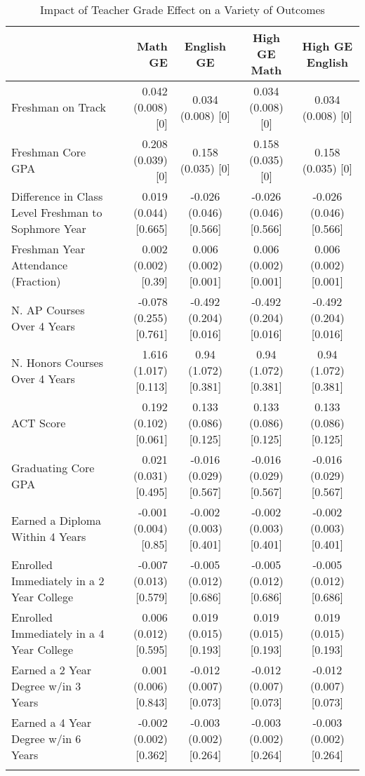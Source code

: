 \begin{table}

\caption{Impact of Teacher Grade Effect on a Variety of Outcomes\label{tbl:results}}
\centering
\begin{tabular}[t]{lrccc}
\toprule{}
  & Math GE & English GE & High GE Math & High GE English\\
\midrule{}
Freshman on Track & 0.042 (0.008) [0] & 0.034 (0.008) [0] & 0.034 (0.008) [0] & 0.034 (0.008) [0]\\
Freshman Core GPA & 0.208 (0.039) [0] & 0.158 (0.035) [0] & 0.158 (0.035) [0] & 0.158 (0.035) [0]\\
Difference in Class Level Freshman to Sophmore Year & 0.019 (0.044) [0.665] & -0.026 (0.046) [0.566] & -0.026 (0.046) [0.566] & -0.026 (0.046) [0.566]\\
Freshman Year Attendance (Fraction) & 0.002 (0.002) [0.39] & 0.006 (0.002) [0.001] & 0.006 (0.002) [0.001] & 0.006 (0.002) [0.001]\\
N. AP Courses Over 4 Years & -0.078 (0.255) [0.761] & -0.492 (0.204) [0.016] & -0.492 (0.204) [0.016] & -0.492 (0.204) [0.016]\\
\addlinespace
N. Honors Courses Over 4 Years & 1.616 (1.017) [0.113] & 0.94 (1.072) [0.381] & 0.94 (1.072) [0.381] & 0.94 (1.072) [0.381]\\
ACT Score & 0.192 (0.102) [0.061] & 0.133 (0.086) [0.125] & 0.133 (0.086) [0.125] & 0.133 (0.086) [0.125]\\
Graduating Core GPA & 0.021 (0.031) [0.495] & -0.016 (0.029) [0.567] & -0.016 (0.029) [0.567] & -0.016 (0.029) [0.567]\\
Earned a Diploma Within 4 Years & -0.001 (0.004) [0.85] & -0.002 (0.003) [0.401] & -0.002 (0.003) [0.401] & -0.002 (0.003) [0.401]\\
Enrolled Immediately in a 2 Year College & -0.007 (0.013) [0.579] & -0.005 (0.012) [0.686] & -0.005 (0.012) [0.686] & -0.005 (0.012) [0.686]\\
\addlinespace
Enrolled Immediately in a 4 Year College & 0.006 (0.012) [0.595] & 0.019 (0.015) [0.193] & 0.019 (0.015) [0.193] & 0.019 (0.015) [0.193]\\
Earned a 2 Year Degree w/in 3 Years & 0.001 (0.006) [0.843] & -0.012 (0.007) [0.073] & -0.012 (0.007) [0.073] & -0.012 (0.007) [0.073]\\
Earned a 4 Year Degree w/in 6 Years & -0.002 (0.002) [0.362] & -0.003 (0.002) [0.264] & -0.003 (0.002) [0.264] & -0.003 (0.002) [0.264]\\
\bottomrule{}
\end{tabular}
\end{table}
